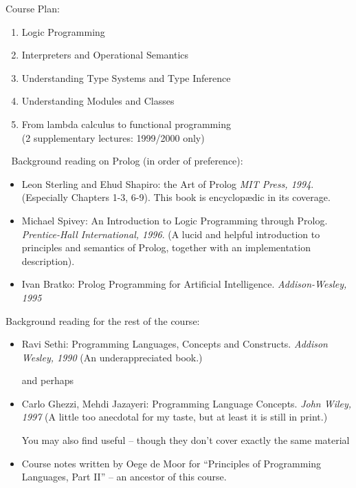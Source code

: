\documentclass{popl}
\begin{document}
\begin{foil}\smaller
Course Plan:
\begin{enumerate}
\item Logic Programming
\item Interpreters and Operational Semantics 
\item Understanding Type Systems and Type Inference
\item Understanding Modules and Classes
\item From lambda calculus to functional programming \\(2 supplementary lectures: 1999/2000 only)
\end{enumerate}

Background reading on Prolog (in order of preference):
\begin{itemize}
\item Leon Sterling and Ehud Shapiro: the Art of Prolog {\it MIT Press, 1994}.
(Especially Chapters 1-3, 6-9). This book is encyclop{\ae}dic in its coverage.

\item Michael Spivey: An Introduction to Logic Programming through Prolog. 
{\it Prentice-Hall International, 1996}. 
(A lucid and helpful introduction to principles and semantics of Prolog, 
together with an implementation description).

\item Ivan Bratko: Prolog Programming for Artificial Intelligence. 
{\it Addison-Wesley, 1995}
\end{itemize}

Background reading for the rest of the course:
\begin{itemize}
\item Ravi Sethi: Programming Languages, Concepts and Constructs.
{\it Addison Wesley, 1990} (An underappreciated book.)

and perhaps

\item Carlo Ghezzi, Mehdi Jazayeri: Programming Language Concepts. 
{\it John Wiley, 1997} (A little too anecdotal for my taste, but at least it is
still in print.)

You may also find useful -- though they don't cover exactly the same material

\item Course notes written by Oege de Moor for 
``Principles of Programming Languages, Part II'' -- an ancestor of this course. 
\end{itemize}
\end{foil}
\end{document}
